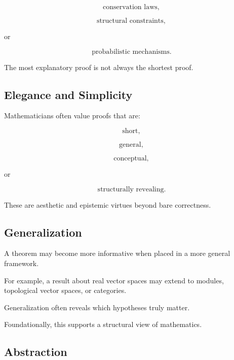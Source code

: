 \[
\boxed{
\text{conservation laws},
}
\]

\[
\boxed{
\text{structural constraints},
}
\]

or

\[
\boxed{
\text{probabilistic mechanisms}.
}
\]

The most explanatory proof is not always the shortest proof.

\subsection{Elegance and Simplicity}
\label{subsec:mathematical-elegance}

Mathematicians often value proofs that are:

\[
\boxed{
\text{short},
}
\]

\[
\boxed{
\text{general},
}
\]

\[
\boxed{
\text{conceptual},
}
\]

or

\[
\boxed{
\text{structurally revealing}.
}
\]

These are aesthetic and epistemic virtues beyond bare correctness.

\subsection{Generalization}
\label{subsec:philosophy-generalization}

A theorem may become more informative when placed in a more general
framework.

For example, a result about real vector spaces may extend to modules,
topological vector spaces, or categories.

Generalization often reveals which hypotheses truly matter.

Foundationally, this supports a structural view of mathematics.

\subsection{Abstraction}
\label{subsec:philosophy-abstraction}


